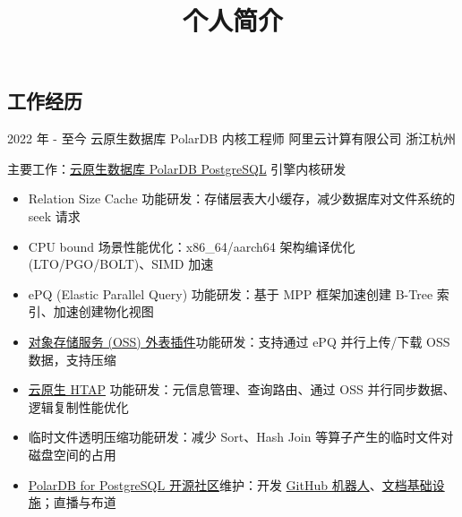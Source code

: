 \documentclass[11pt,a4paper,sans]{moderncv}   %
\title{个人简介}                     %
\begin{document}
\begin{CJK}{UTF8}{gbsn}                       %
\maketitle


\section{工作经历}
\cventry
{2022 年 - 至今}
{云原生数据库 PolarDB 内核工程师}
{阿里云计算有限公司}
{浙江杭州}{}{
  主要工作：\href{https://www.aliyun.com/product/apsaradb/polardbpg}{云原生数据库 PolarDB PostgreSQL} 引擎内核研发
  \small
  \begin{itemize}%
    \item{
      Relation Size Cache 功能研发：存储层表大小缓存，减少数据库对文件系统的 seek 请求
    }
    \item{
      CPU bound 场景性能优化：x86\_64/aarch64 架构编译优化 (LTO/PGO/BOLT)、SIMD 加速
    }
    \item{
      ePQ (Elastic Parallel Query) 功能研发：基于 MPP 框架加速创建 B-Tree 索引、加速创建物化视图
    }
    \item{
      \href{https://help.aliyun.com/zh/polardb/polardb-for-postgresql/read-and-write-external-data-files-by-using-oss-fdw}{对象存储服务 (OSS) 外表插件}功能研发：支持通过 ePQ 并行上传/下载 OSS 数据，支持压缩
    }
    \item{
      \href{https://help.aliyun.com/zh/polardb/polardb-for-postgresql/one-stop-htap-service}{云原生 HTAP} 功能研发：元信息管理、查询路由、通过 OSS 并行同步数据、逻辑复制性能优化
    }
    \item{
      临时文件透明压缩功能研发：减少 Sort、Hash Join 等算子产生的临时文件对磁盘空间的占用
    }
    \item{
      \href{https://github.com/ApsaraDB/PolarDB-for-PostgreSQL}{PolarDB for PostgreSQL 开源社区}维护：开发 \href{https://github.com/mrdrivingduck/polardb-bot}{GitHub 机器人}、\href{https://apsaradb.github.io/PolarDB-for-PostgreSQL/zh/}{文档基础设施}；直播与布道
    }
  \end{itemize}
}


\end{CJK}
\end{document}
